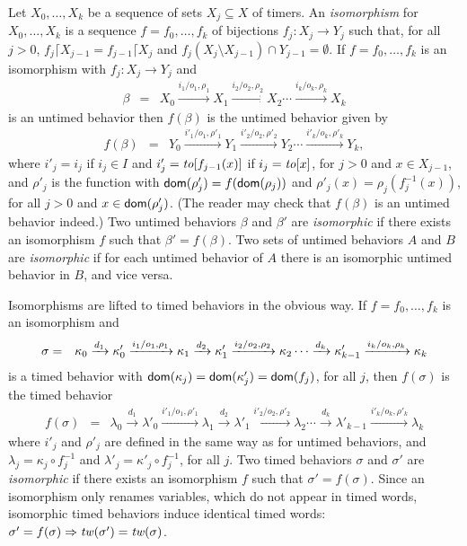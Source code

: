 Let $X_0,\ldots, X_k$ be a sequence of sets $X_j \subseteq X$ of timers.
An \emph{isomorphism} for $X_0,\ldots, X_k$ is a sequence $f = f_0 ,\ldots, f_k$ of bijections $f_j : X_j \rightarrow Y_j$ such that,
for all $j>0$, $f_j \lceil X_{j-1} = f_{j-1} \lceil X_j$ and $f_j (X_j \setminus X_{j-1}) \cap Y_{j-1} = \emptyset$.
If $f = f_0 ,\ldots, f_k$ is an isomorphism with $f_j : X_j \rightarrow Y_j$ and
\begin{eqnarray*}
\beta & = & X_0 \xrightarrow{i_1/o_1, \rho_1} X_1  \xrightarrow{i_2/o_2, \rho_2} X_2 \cdots \xrightarrow{i_k/o_k, \rho_k} X_{k}
\end{eqnarray*}
is an untimed behavior then $f(\beta)$ is the untimed behavior given by
\begin{eqnarray*}
f(\beta) & = & Y_0 \xrightarrow{i'_1/o_1, \rho'_1} Y_1  \xrightarrow{i'_2/o_2, \rho'_2} Y_2 \cdots \xrightarrow{i'_k/o_k, \rho'_k} Y_{k},
\end{eqnarray*}
where 
$i'_j = i_j$ if $i_j \in I$ and $i'_j = \mathit{to}[f_{j-1}(x)]$ if $i_j = \mathit{to}[x]$, for $j>0$ and $x \in X_{j-1}$, and
$\rho'_j$ is the function with ${\textsf{dom}}(\rho'_j) = f({\textsf{dom}}(\rho_j))$ and
$\rho'_j(x) = \rho_j ( f_j^{-1}(x))$, for all $j>0$ and $x\in{\textsf{dom}}(\rho'_j)$.
(The reader may check that $f(\beta)$ is an untimed behavior indeed.)
Two untimed behaviors $\beta$ and $\beta'$ are \emph{isomorphic} if there exists an isomorphism $f$ such that
$\beta' = f(\beta)$.
Two sets of untimed behaviors $A$ and $B$ are \emph{isomorphic} if for each untimed behavior of $A$ there is an isomorphic untimed behavior in $B$,
and vice versa.

Isomorphisms are lifted to timed behaviors in the obvious way. If $f = f_0 ,\ldots, f_k$ is an isomorphism and
\begin{eqnarray*}
\sigma & = & \kappa_0 \xrightarrow{d_1} \kappa'_0 \xrightarrow{i_1/o_1, \rho_1} \kappa_1 \xrightarrow{d_2} \kappa'_1 \xrightarrow{i_2/o_2, \rho_2} \kappa_2 \cdots
\xrightarrow{d_k} \kappa'_{k-1} \xrightarrow{i_k/o_k, \rho_k} \kappa_{k}
\end{eqnarray*}
is a timed behavior with ${\textsf{dom}}(\kappa_j) = {\textsf{dom}}(\kappa'_j) = {\textsf{dom}}(f_j)$, for all $j$, then $f(\sigma)$ is
the timed behavior
\begin{eqnarray*}
f(\sigma) & = & \lambda_0 \xrightarrow{d_1} \lambda'_0 \xrightarrow{i'_1/o_1, \rho'_1} \lambda_1 \xrightarrow{d_2} \lambda'_1 \xrightarrow{i'_2/o_2, \rho'_2} \lambda_2 \cdots
\xrightarrow{d_k} \lambda'_{k-1} \xrightarrow{i'_k/o_k, \rho'_k} \lambda_{k}
\end{eqnarray*}
where $i'_j$ and $\rho'_j$ are defined in the same way as for untimed behaviors, and
$\lambda_j = \kappa_j \circ f_j^{-1}$ and $\lambda'_j = \kappa'_j \circ f_j^{-1}$, for all $j$.
Two timed behaviors $\sigma$ and $\sigma'$ are \emph{isomorphic} if there exists an isomorphism $f$ such that
$\sigma' = f(\sigma)$.
Since an isomorphism only renames variables, which do not appear in timed words, 
isomorphic timed behaviors induce identical timed words: $\sigma' = f(\sigma) \Rightarrow \mathit{tw}(\sigma') = \mathit{tw}(\sigma)$.

